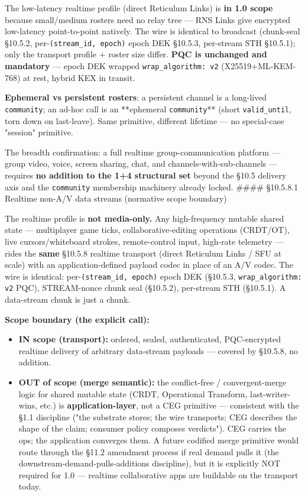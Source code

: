 \documentclass[11pt]{article}
\begin{document}
The low-latency realtime profile (direct Reticulum Links) is \textbf{in 1.0 scope} because small/medium rosters need no relay tree — RNS Links give encrypted low-latency point-to-point natively. The wire is identical to broadcast (chunk-seal §10.5.2, per-\texttt{(stream\_id, epoch)} epoch DEK §10.5.3, per-stream STH §10.5.1); only the transport profile + roster size differ. \textbf{PQC is unchanged and mandatory} — epoch DEK wrapped \texttt{wrap\_algorithm: v2} (X25519+ML-KEM-768) at rest, hybrid KEX in transit.


\textbf{Ephemeral vs persistent rosters}: a persistent channel is a long-lived \texttt{community}; an ad-hoc call is an **ephemeral \texttt{community}** (short \texttt{valid\_until}, torn down on last-leave). Same primitive, different lifetime — no special-case "session" primitive.


The breadth confirmation: a full realtime group-communication platform — group video, voice, screen sharing, chat, and channels-with-sub-channels — requires \textbf{no addition to the 1+4 structural set} beyond the §10.5 delivery axis and the \texttt{community} membership machinery already locked. \#\#\#\# §10.5.8.1 Realtime non-A/V data streams (normative scope boundary)


The realtime profile is \textbf{not media-only.} Any high-frequency mutable shared state — multiplayer game ticks, collaborative-editing operations (CRDT/OT), live cursors/whiteboard strokes, remote-control input, high-rate telemetry — rides the \textbf{same} §10.5.8 realtime transport (direct Reticulum Links / SFU at scale) with an application-defined payload codec in place of an A/V codec. The wire is identical: per-\texttt{(stream\_id, epoch)} epoch DEK (§10.5.3, \texttt{wrap\_algorithm: v2} PQC), STREAM-nonce chunk seal (§10.5.2), per-stream STH (§10.5.1). A data-stream chunk is just a chunk.


\textbf{Scope boundary (the explicit call):}

\begin{itemize}\setlength\itemsep{0pt}
\item \textbf{IN scope (transport):} ordered, sealed, authenticated, PQC-encrypted realtime delivery of arbitrary data-stream payloads — covered by §10.5.8, no addition.
\item \textbf{OUT of scope (merge semantic):} the conflict-free / convergent-merge logic for shared mutable state (CRDT, Operational Transform, last-writer-wins, etc.) is \textbf{application-layer}, not a CEG primitive — consistent with the §1.1 discipline ("the substrate stores; the wire transports; CEG describes the shape of the claim; consumer policy composes verdicts"). CEG carries the ops; the application converges them. A future codified merge primitive would route through the §11.2 amendment process if real demand pulls it (the downstream-demand-pulls-additions discipline), but it is explicitly NOT required for 1.0 — realtime collaborative apps are buildable on the transport today.
\end{itemize}
\end{document}
